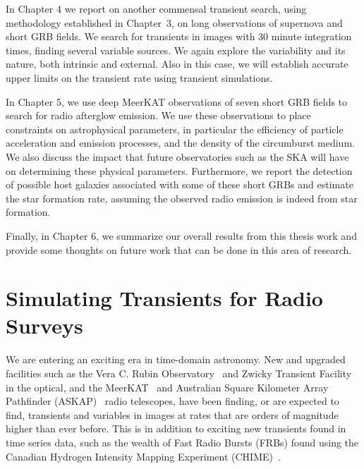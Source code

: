 \documentclass[12pt]{article}
\begin{document}
In Chapter 4 we report on another commensal transient search, using methodology established in Chapter~3, on long observations of supernova and short GRB fields. We search for transients in images with 30 minute integration times, finding several variable sources. We again explore the variability and its nature, both intrinsic and external. Also in this case, we will establish accurate upper limits on the transient rate using transient simulations. 

In Chapter 5, we use deep MeerKAT observations of seven short GRB fields to search for radio afterglow emission. We use these observations to place constraints on astrophysical parameters, in particular the efficiency of particle acceleration and emission processes, and the density of the circumburst medium. We also discuss the impact that future observatories such as the SKA will have on determining these physical parameters. Furthermore, we report the detection of possible host galaxies associated with some of these short GRBs and estimate the star formation rate, assuming the observed radio emission is indeed from star formation.

Finally, in Chapter 6, we summarize our overall results from this thesis work and provide some thoughts on future work that can be done in this area of research.




\newpage
\section{Simulating Transients for Radio Surveys}
\label{sec:transientsims}
\label{sec:sample1}

We are entering an exciting era in time-domain astronomy.  New and upgraded facilities such as the Vera C. Rubin Observatory~\citep{2019ApJ...873..111I} and Zwicky Transient Facility~\citep{2019PASP..131a8002B} in the optical, and the MeerKAT~\citep{2016mks..confE...1J} and Australian Square Kilometer Array Pathfinder (ASKAP)~\citep{2021PASA...38...54M} radio telescopes, have been finding, or are expected to find, transients and variables in images at rates that are orders of magnitude higher than ever before. This is in addition to exciting new transients found in time series data, such as the wealth of Fast Radio Bursts (FRBs) found using the Canadian Hydrogen Intensity Mapping Experiment (CHIME)~\citep{2019Natur.566..235C}. 
\end{document}
